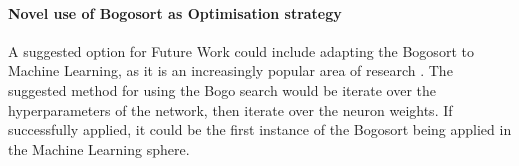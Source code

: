 \documentclass{UoNMCHA}
\numberwithin{equation}{section}
\begin{document}
\paragraph{Novel use of Bogosort as Optimisation strategy}
A suggested option for Future Work could include adapting the Bogosort to Machine Learning, as it is an increasingly popular area of research \cite{Bogo_Gruber2007} \cite{Bogo_Holzer2018} \cite{Bogo_max}. The suggested method for using the Bogo search would be iterate over the hyperparameters of the network, then iterate over the neuron weights. If successfully applied, it could be the first instance of the Bogosort being applied in the Machine Learning sphere.
\newpage 
%
\end{document}
